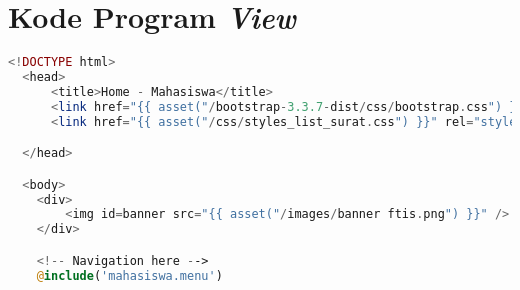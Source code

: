 \chapter{Kode Program \textit{View}}
\label{lamp:A}

\singlespacing 
%
%

\begin{lstlisting}[language=php, basicstyle=\tiny, caption=\textit{Home} mahasiswa]
	<!DOCTYPE html>
  <head>
      <title>Home - Mahasiswa</title>
      <link href="{{ asset("/bootstrap-3.3.7-dist/css/bootstrap.css") }}" rel="stylesheet" type="text/css" />
      <link href="{{ asset("/css/styles_list_surat.css") }}" rel="stylesheet" type="text/css">

  </head>

  <body>
    <div>
        <img id=banner src="{{ asset("/images/banner ftis.png") }}" />
    </div>

    <!-- Navigation here -->
    @include('mahasiswa.menu')


\end{lstlisting}
